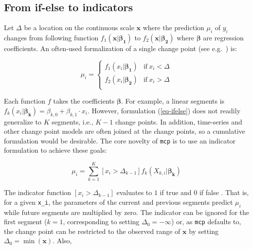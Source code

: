 \documentclass[
  american,
]{article}
\begin{document}
\hypertarget{from-if-else-to-indicators}{%
\subsection{From if-else to indicators}\label{from-if-else-to-indicators}}

Let \(\Delta\) be a location on the continuous scale \(\mathbf{x}\) where the prediction \(\mu_i\) of \(y_i\) changes from following function \(f_1(\mathbf{x}|\mathbf{\beta_1})\) to \(f_2(\mathbf{x|\mathbf{\beta_2}})\) where \(\mathbf{\beta}\) are regression coefficients. An often-used formalization of a single change point (see e.g.~\citep{stephens1994, carlin1992}) is:

\begin{equation}
\label{eq-ifelse}
\mu_i = \begin{cases}
      f_1(x_i | \mathbf{\beta_1}) & \text{if}\ x_i < \Delta \\
      f_2(x_i | \mathbf{\beta_2}) & \text{if}\ x_i > \Delta \\
    \end{cases}
\end{equation}

Each function \(f\) takes the coefficients \(\mathbf{\beta}\). For example, a linear segments is \(f_k(x_i | \mathbf{\beta_k}) = \beta_{k, 0} + \beta_{k, 1} \cdot x_i\). However, formulation (\ref{eq-ifelse}) does not readily generalize to \(K\) segments, i.e., \(K-1\) change points. In addition, time-series and other change point models are often joined at the change points, so a cumulative formulation would be desirable. The core novelty of \texttt{mcp} is to use an indicator formulation to achieve these goals:

\begin{equation}
\label{eq-indicator}
\mu_i = \sum_{k=1}^{K} [x_i > \Delta_{k-1}]  f_k(X_{k, i} | \mathbf{\beta_k})
\end{equation}

The indicator function \([x_i > \Delta_{k-1}]\) evaluates to \(1\) if true and \(0\) if false \citep{knuth1992}. That is, for a given \texttt{x\_i}, the parameters of the current and previous segments predict \(\mu_i\) while future segments are multiplied by zero. The indicator can be ignored for the first segment (\(k = 1\), corresponding to setting \(\Delta_0 = -\infty\)) or, as \texttt{mcp} defaults to, the change point can be restricted to the observed range of \(\mathbf{x}\) by setting \(\Delta_0 = \min(\mathbf{x})\). Also,
\end{document}
